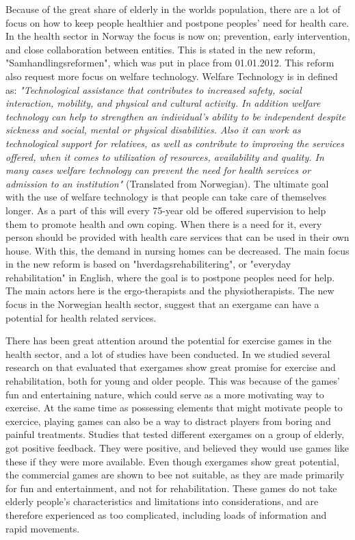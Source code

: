 Because of the great share of elderly in the worlds population, there are a lot of focus on how to keep people healthier and postpone peoples' need for health care.  In the health sector in Norway the focus is now on; prevention, early intervention, and close collaboration between entities. This is stated in the new reform, "Samhandlingsreformen", which was put in place from 01.01.2012. This reform also request more focus on welfare technology. Welfare Technology is in \cite{welfare} defined as: \emph{"Technological assistance that contributes to increased safety, social interaction, mobility, and physical and cultural activity. In addition welfare technology can help to strengthen an individual's ability to be independent despite sickness and social, mental or physical disabilities. Also it can work as technological support for relatives, as well as contribute to improving the services offered, when it comes to utilization of resources, availability and quality. In many cases welfare technology can prevent the need for health services or admission to an institution"} (Translated from Norwegian). The ultimate goal with the use of welfare technology is that people can take care of themselves longer.  As a part of this will every 75-year old be offered supervision to help them to promote health and own coping. When there is a need for it, every person should be provided with health care services that can be used in their own house. With this, the demand in nursing homes can be decreased. The main focus in the new reform is based on "hverdagsrehabilitering", or "everyday rehabilitation" in English, where the goal is to postpone peoples need for help. The main actors here is the ergo-therapists and the physiotherapists. The new focus in the Norwegian health sector, suggest that an exergame can have a potential for health related services.

There has been great attention around the potential for exercise games in the health sector, and a lot of studies have been conducted. In \cite{project} we studied several research on that evaluated that exergames show great promise for exercise and rehabilitation, both for young and older people. This was because of the games' fun and entertaining nature, which could serve as a more motivating way to exercise. At the same time as possessing elements that might motivate people to exercice, playing games can also be a way to distract players from boring and painful treatments. Studies that tested different exergames on a group of elderly, got positive feedback. They were positive, and believed they would use games like these if they were more available. Even though exergames show great potential, the commercial games  are shown to bee not suitable, as they are made primarily for fun and entertainment, and not for rehabilitation. These games do not take elderly people's characteristics and limitations into considerations, and are therefore experienced as too complicated, including loads of information and rapid movements.

